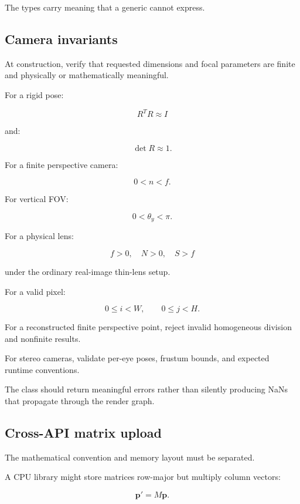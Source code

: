 The types carry meaning that a generic  cannot express.

\subsection{Camera invariants}\label{02-foundations-ii-ch037-camera-invariants}

\hypertarget{02-foundations-ii-ch037-camera-invariants}{}

At construction, verify that requested dimensions and focal parameters are finite and physically or mathematically meaningful.

For a rigid pose:

\[ R^TR\approx I \]

and:

\[ \det R\approx1. \]

For a finite perspective camera:

\[ 0<n<f. \]

For vertical FOV:

\[ 0<\theta_y<\pi. \]

For a physical lens:

\[ f>0,\quad N>0,\quad S>f \]

under the ordinary real-image thin-lens setup.

For a valid pixel:

\[ 0\le i<W,\qquad0\le j<H. \]

For a reconstructed finite perspective point, reject invalid homogeneous division and nonfinite results.

For stereo cameras, validate per-eye poses, frustum bounds, and expected runtime conventions.

The class should return meaningful errors rather than silently producing NaNs that propagate through the render graph.

\subsection{Cross-API matrix upload}\label{02-foundations-ii-ch037-cross-api-matrix-upload}

\hypertarget{02-foundations-ii-ch037-cross-api-matrix-upload}{}

The mathematical convention and memory layout must be separated.

A CPU library might store matrices row-major but multiply column vectors:

\[ \mathbf p'=M\mathbf p. \]

